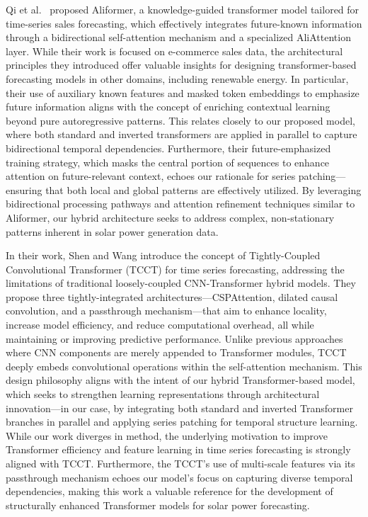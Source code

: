 \documentclass[12pt]{uomthesis}
\begin{document}
Qi et al.~\cite{qi2021known} proposed Aliformer, a knowledge-guided transformer model tailored for time-series sales forecasting, which effectively integrates future-known information through a bidirectional self-attention mechanism and a specialized AliAttention layer. While their work is focused on e-commerce sales data, the architectural principles they introduced offer valuable insights for designing transformer-based forecasting models in other domains, including renewable energy. In particular, their use of auxiliary known features and masked token embeddings to emphasize future information aligns with the concept of enriching contextual learning beyond pure autoregressive patterns. This relates closely to our proposed model, where both standard and inverted transformers are applied in parallel to capture bidirectional temporal dependencies. Furthermore, their future-emphasized training strategy, which masks the central portion of sequences to enhance attention on future-relevant context, echoes our rationale for series patching—ensuring that both local and global patterns are effectively utilized. By leveraging bidirectional processing pathways and attention refinement techniques similar to Aliformer, our hybrid architecture seeks to address complex, non-stationary patterns inherent in solar power generation data.

In their work, Shen and Wang \cite{shen2022tcct} introduce the concept of Tightly-Coupled Convolutional Transformer (TCCT) for time series forecasting, addressing the limitations of traditional loosely-coupled CNN-Transformer hybrid models. They propose three tightly-integrated architectures—CSPAttention, dilated causal convolution, and a passthrough mechanism—that aim to enhance locality, increase model efficiency, and reduce computational overhead, all while maintaining or improving predictive performance. Unlike previous approaches where CNN components are merely appended to Transformer modules, TCCT deeply embeds convolutional operations within the self-attention mechanism. This design philosophy aligns with the intent of our hybrid Transformer-based model, which seeks to strengthen learning representations through architectural innovation—in our case, by integrating both standard and inverted Transformer branches in parallel and applying series patching for temporal structure learning. While our work diverges in method, the underlying motivation to improve Transformer efficiency and feature learning in time series forecasting is strongly aligned with TCCT. Furthermore, the TCCT’s use of multi-scale features via its passthrough mechanism echoes our model's focus on capturing diverse temporal dependencies, making this work a valuable reference for the development of structurally enhanced Transformer models for solar power forecasting.
\end{document}
